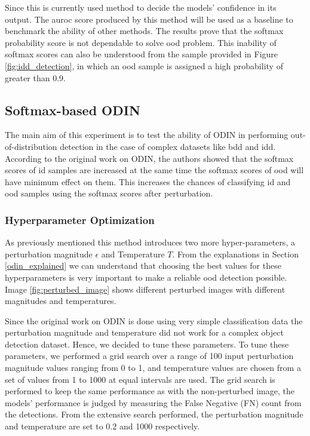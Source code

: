     Since this is currently used method to decide the models' confidence in its output. The \acrshort{auroc} score produced by this method will be used as a baseline to benchmark the ability of other methods. The results prove that the softmax probability score is not dependable to solve \acrshort{ood} problem. This inability of softmax scores can also be understood from the sample provided in Figure \ref{fig:idd_detection}, in which an \acrshort{ood} sample is assigned a high probability of greater than 0.9.
    
    \subsection{Softmax-based ODIN}
    The main aim of this experiment is to test the ability of ODIN in performing out-of-distribution detection in the case of complex datasets like \acrshort{bdd} and \acrshort{idd}. According to the original work on ODIN, the authors showed that the softmax scores of \acrshort{id} samples are increased at the same time the softmax scores of \acrshort{ood} will have minimum effect on them. This increases the chances of classifying \acrshort{id} and \acrshort{ood} samples using the softmax scores after perturbation.
    \subsubsection{Hyperparameter Optimization}
    As previously mentioned this method introduces two more hyper-parameters, a perturbation magnitude $\epsilon$ and Temperature $T$. From the explanations in Section \ref{odin_explained} we can understand that choosing the best values for these hyperparameters is very important to make a reliable \acrshort{ood} detection possible. Image \ref{fig:perturbed_image} shows different perturbed images with different magnitudes and temperatures.
    
    Since the original work on ODIN is done using very simple classification data the perturbation magnitude and temperature did not work for a complex object detection dataset. Hence, we decided to tune these parameters. To tune these parameters, we performed a grid search over a range of 100 input perturbation magnitude values ranging from 0 to 1, and temperature values are chosen from a set of values from 1 to 1000 at equal intervals are used. The grid search is performed to keep the same performance as with the non-perturbed image, the models' performance is judged by measuring the False Negative (FN) count from the detections. From the extensive search performed, the perturbation magnitude and temperature are set to 0.2 and 1000 respectively.
    
